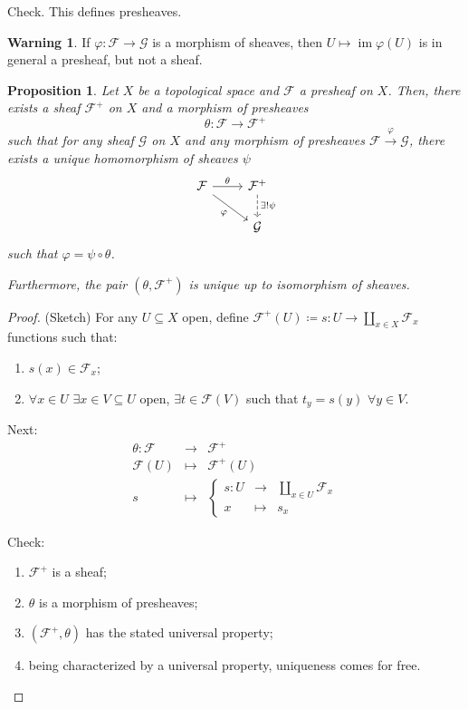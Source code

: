 \documentclass[12pt]{article}
\DeclareMathOperator{\im}{im}
\newtheorem*{proposition}{Proposition}
\theoremstyle{definition}
\newtheorem*{warning}{Warning}
\theoremstyle{remark}
\begin{document}
Check. This defines presheaves.

\begin{warning}
If $\varphi:\mathcal{F}\rightarrow\mathcal{G}$ is a morphism of sheaves, then $U\mapsto\im\varphi(U)$ is in general a presheaf, but not a sheaf.
\end{warning}

\begin{proposition}
Let $X$ be a topological space and $\mathcal{F}$ a presheaf on $X$. Then, there exists a sheaf $\mathcal{F}^+$ on $X$ and a morphism of presheaves
\[\theta:\mathcal{F}\longrightarrow\mathcal{F}^+\]
such that for any sheaf $\mathcal{G}$ on $X$ and any morphism of presheaves $\mathcal{F}\xrightarrow{\varphi}\mathcal{G}$, there exists a unique homomorphism of sheaves $\psi$
\[
\begin{tikzcd}
\mathcal{F}\arrow[r,"\theta"]\arrow[rd,"\varphi",swap]&\mathcal{F}^+\arrow[d,"\exists!\psi",dashed]\\
&\mathcal{G}
\end{tikzcd}
\]
such that $\varphi=\psi\circ\theta$.

Furthermore, the pair $(\theta,\mathcal{F}^+)$ is unique up to isomorphism of sheaves.
\end{proposition}

\begin{proof}
(Sketch) For any $U\subseteq X$ open, define $\mathcal{F}^+(U)\coloneqq s:U\rightarrow\coprod_{x\in X}\mathcal{F}_x$ functions  such that:
\begin{enumerate}[label=\roman*)]
\item $s(x)\in\mathcal{F}_x$;
\item $\forall x\in U$ $\exists x\in V\subseteq U$ open, $\exists t\in\mathcal{F}(V)$ such that $t_y=s(y)$ $\forall y\in V$.
\end{enumerate}

Next:
\[
\begin{array}{rcl}
\theta:\mathcal{F}&\longrightarrow&\mathcal{F}^+\\
\mathcal{F}(U)&\longmapsto&\mathcal{F}^+(U)\\
s&\longmapsto&\left\{\begin{array}{rcl}s:U&\longrightarrow&\coprod_{x\in U}\mathcal{F}_x\\x&\longmapsto&s_x\end{array}\right.
\end{array}
\]

Check:
\begin{enumerate}[label=\arabic*)]
\item $\mathcal{F}^+$ is a sheaf;
\item $\theta$ is a morphism of presheaves;
\item $(\mathcal{F}^+,\theta)$ has the stated universal property;
\item being characterized by a universal property, uniqueness comes for free.
\end{enumerate}
\end{proof}
\end{document}
